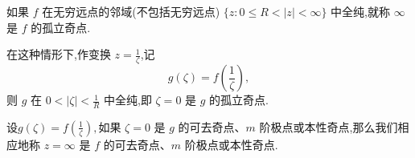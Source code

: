 \documentclass[../../main.tex]{subfiles}
\begin{document}
\begin{definition}
如果 \( f \) 在无穷远点的邻域(不包括无穷远点) \( \{ z: 0 \leqslant R < |z| < \infty \} \) 中全纯,就称 \( \infty \) 是 \( f \) 的孤立奇点.
\end{definition}
\begin{remark}
在这种情形下,作变换 \( z = \frac{1}{\zeta} \),记
\[
g(\zeta) = f\left( \frac{1}{\zeta} \right),
\]
则 \( g \) 在 \( 0 < |\zeta| < \frac{1}{R} \) 中全纯,即 \( \zeta = 0 \) 是 \( g \) 的孤立奇点.
\end{remark}

\begin{definition}
设$g(\zeta) = f\left( \frac{1}{\zeta} \right),$如果 \( \zeta = 0 \) 是 \( g \) 的可去奇点、\( m \) 阶极点或本性奇点,那么我们相应地称 \( z = \infty \) 是 \( f \) 的可去奇点、\( m \) 阶极点或本性奇点.
\end{definition}
\end{document}

